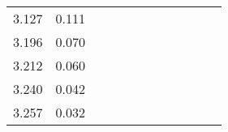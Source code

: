 \begin{table*}
\begin{tabular}{|cc|cc|cc|cc|cc|cc|}
    3.127 & 0.111 &  &  &  &  &  &  &  &  &  &  \\
    3.196 & 0.070 &  &  &  &  &  &  &  &  &  &  \\
    3.212 & 0.060 &  &  &  &  &  &  &  &  &  &  \\
    3.240 & 0.042 &  &  &  &  &  &  &  &  &  &  \\
    3.257 & 0.032 &  &  &  &  &  &  &  &  &  & \\ \hline
    \end{tabular}
    \label{tab:in}
\end{table*}